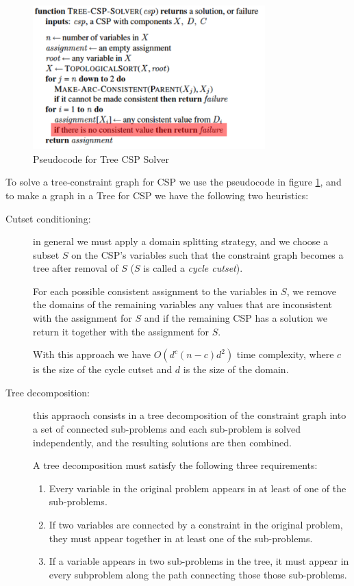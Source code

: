 \begin{figure}
	\includegraphics[width=0.8\textwidth]{Images/tree-CSP-Solver}
	\caption{Pseudocode for Tree CSP Solver}
	\label{img:treeSolver}
\end{figure}
To solve a tree-constraint graph for CSP we use the pseudocode in figure 
\ref{img:treeSolver}, and to make a graph in a Tree for CSP we have the following
two heuristics:
\begin{description}
    \item [Cutset conditioning: ] in general we must apply a domain splitting strategy,
	    and we choose a subset $S$ on the CSP's variables such that the constraint
	    graph becomes a tree after removal of $S$ ($S$ is called a \emph{cycle cutset}).

	   For each possible consistent assignment to the variables in $S$, we remove
	   the domains of the remaining variables any values that are inconsistent 
	   with the assignment for $S$ and if the remaining CSP has a solution
	   we return it together with the assignment for $S$.

	  With this approach we have $O(d^c (n-c)d^2)$ time complexity, where $c$ is
	  the size of the cycle cutset and $d$ is the size of the domain.
   \item [Tree decomposition: ] this appraoch consists in a tree decomposition of the 
	   constraint graph into a set of connected sub-problems and each sub-problem
	   is solved independently, and the resulting solutions are then combined.
	
	A tree decomposition must satisfy the following three requirements:
	\begin{enumerate}
	   \item Every variable in the original problem appears in at least of one 
		 of the sub-problems.
	   \item If two variables are connected by a constraint in the original problem,
		 they must appear together in at least one of the sub-problems.
	   \item If a variable appears in two sub-problems in the tree, it must
		 appear in every subproblem along the path connecting those 
		 those sub-problems.
	\end{enumerate}
\end{description}
